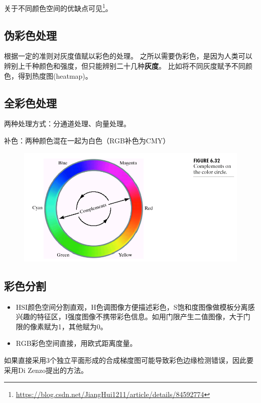 关于不同颜色空间的优缺点可见\footnote{\url{https://blog.csdn.net/JiangHui1211/article/details/84592774}}。

\subsection{伪彩色处理}
根据一定的准则对灰度值赋以彩色的处理。
之所以需要伪彩色，是因为人类可以辨别上千种颜色和强度，但只能辨别二十几种\textbf{灰度}。
比如将不同灰度赋予不同颜色，得到热度图(heatmap)。

\subsection{全彩色处理}
两种处理方式：分通道处理、向量处理。

补色：两种颜色混在一起为白色（RGB补色为CMY）
\begin{figure}[H]
\centering
\includegraphics[width=0.6\linewidth]{fig/complements.png}
\end{figure}

\subsection{彩色分割}
\begin{itemize}
	\item HSI颜色空间分割直观，H色调图像方便描述彩色，S饱和度图像做模板分离感兴趣的特征区，I强度图像不携带彩色信息。如用门限产生二值图像，大于门限的像素赋为1，其他赋为0。
	\item RGB彩色空间直接，用欧式距离度量。
\end{itemize}

如果直接采用3个独立平面形成的合成梯度图可能导致彩色边缘检测错误，因此要采用Di Zenzo提出的方法。